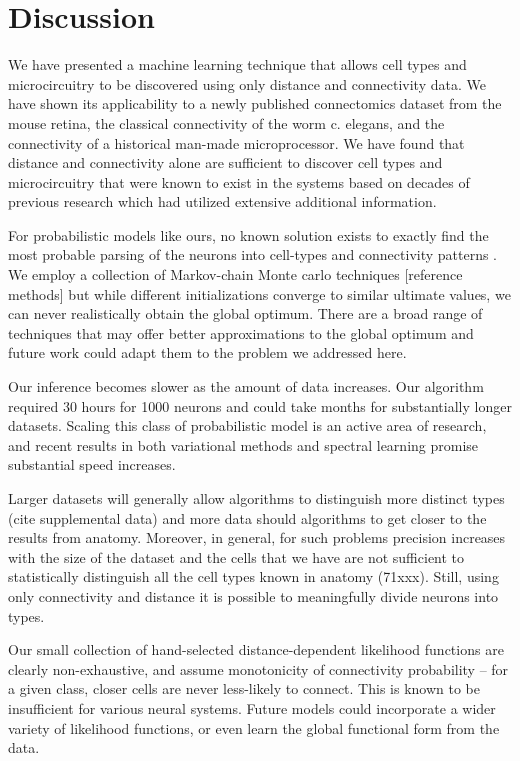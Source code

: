 \documentclass{article}
\begin{document}
\section{Discussion}
We have presented a machine learning technique that allows cell types
and microcircuitry to be discovered using only distance and
connectivity data. We have shown its applicability to a newly
published connectomics dataset from the mouse retina, the classical
connectivity of the worm c. elegans, and the connectivity of a
historical man-made microprocessor. We have found that distance and
connectivity alone are sufficient to discover cell types and
microcircuitry that were known to exist in the systems based on decades
of previous research which had utilized extensive additional
information.

For probabilistic models like ours, no known solution exists to
exactly find the most probable parsing of the neurons into cell-types
and connectivity patterns . We employ a collection of Markov-chain
Monte carlo techniques [reference methods] but while different
initializations converge to similar ultimate values, we can never
realistically obtain the global optimum. There are a broad range of
techniques that may offer better approximations to the global optimum
\autocite{Wanga2012,FritzJonathan} and future work could adapt them to
the problem we addressed here.

Our inference becomes slower as the amount of data increases. Our
algorithm required 30 hours for 1000 neurons and could take months for
substantially longer datasets. Scaling this class of probabilistic
model is an active area of research, and recent results in both
variational methods \autocite{Hoffman2013} and spectral learning
  \autocite{Anandkumar2012} promise substantial speed increases.


  Larger datasets will generally allow algorithms to distinguish more
  distinct types (cite supplemental data) and more data should
  algorithms to get closer to the results from anatomy. Moreover, in
  general, for such problems precision increases with the size of the
  dataset and the cells that we have are not sufficient to
  statistically distinguish all the cell types known in anatomy
  (71xxx). Still, using only connectivity and distance it is possible
  to meaningfully divide neurons into types.

Our small collection of hand-selected distance-dependent likelihood
functions are clearly non-exhaustive, and assume monotonicity
of connectivity probability -- for a given class, closer cells
are never less-likely to connect. This is known to be insufficient
for various neural systems. Future models could incorporate
a wider variety of likelihood functions, or even learn the global
functional form from the data. 
\end{document}
